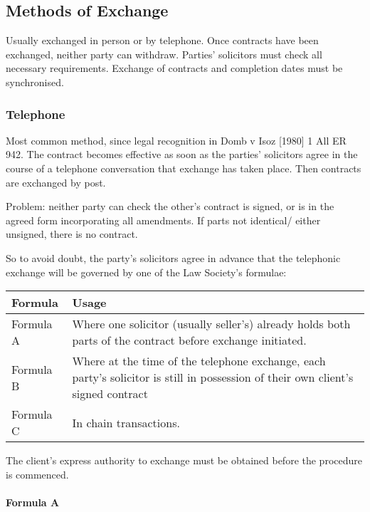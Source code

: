\documentclass[
]{article}
\begin{document}
\hypertarget{methods-of-exchange}{%
\subsection{Methods of Exchange}\label{methods-of-exchange}}

Usually exchanged in person or by telephone. Once contracts have been
exchanged, neither party can withdraw. Parties' solicitors must check
all necessary requirements. Exchange of contracts and completion dates
must be synchronised.

\hypertarget{telephone}{%
\subsubsection{Telephone}\label{telephone}}

Most common method, since legal recognition in Domb v Isoz {[}1980{]} 1
All ER 942. The contract becomes effective as soon as the parties'
solicitors agree in the course of a telephone conversation that exchange
has taken place. Then contracts are exchanged by post.

Problem: neither party can check the other's contract is signed, or is
in the agreed form incorporating all amendments. If parts not identical/
either unsigned, there is no contract.

So to avoid doubt, the party's solicitors agree in advance that the
telephonic exchange will be governed by one of the Law Society's
formulae:

\begin{longtable}[]{@{}ll@{}}
\toprule()
Formula & Usage \\
\midrule()
\endhead
Formula A & Where one solicitor (usually seller's) already holds both
parts of the contract before exchange initiated. \\
Formula B & Where at the time of the telephone exchange, each party's
solicitor is still in possession of their own client's signed
contract \\
Formula C & In chain transactions. \\
\bottomrule()
\end{longtable}

The client's express authority to exchange must be obtained before the
procedure is commenced.

\hypertarget{formula-a}{%
\paragraph{Formula A}\label{formula-a}}
\end{document}
